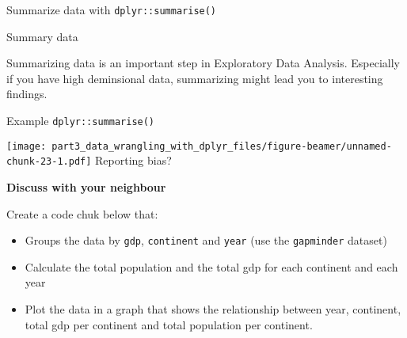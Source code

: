 \documentclass[ignorenonframetext,]{beamer}
\newenvironment{Shaded}{\begin{snugshade}}{\end{snugshade}}
\newcommand{\DataTypeTok}[1]{\textcolor[rgb]{0.13,0.29,0.53}{#1}}
\newcommand{\KeywordTok}[1]{\textcolor[rgb]{0.13,0.29,0.53}{\textbf{#1}}}
\newcommand{\NormalTok}[1]{#1}
\newcommand{\OperatorTok}[1]{\textcolor[rgb]{0.81,0.36,0.00}{\textbf{#1}}}
\newcommand{\StringTok}[1]{\textcolor[rgb]{0.31,0.60,0.02}{#1}}
\providecommand{\tightlist}{%
  \setlength{\itemsep}{0pt}\setlength{\parskip}{0pt}}
\begin{document}
\begin{frame}[fragile]{Summarize data with \texttt{dplyr::summarise()}}
\protect\hypertarget{summarize-data-with-dplyrsummarise}{}

\begin{block}{Summary data}

Summarizing data is an important step in Exploratory Data Analysis.
Especially if you have high deminsional data, summarizing might lead you
to interesting findings.

\end{block}

\begin{block}{Example \texttt{dplyr::summarise()}}

\begin{Shaded}
\end{Shaded}

\texttt{[image: part3\_data\_wrangling\_with\_dplyr\_files/figure-beamer/unnamed-chunk-23-1.pdf]}
Reporting bias?

\end{block}

\begin{block}{\textbf{Discuss with your neighbour}}

Create a code chuk below that:

\begin{itemize}
\tightlist
\item
  Groups the data by \texttt{gdp}, \texttt{continent} and \texttt{year}
  (use the \texttt{gapminder} dataset)
\item
  Calculate the total population and the total gdp for each continent
  and each year
\item
  Plot the data in a graph that shows the relationship between year,
  continent, total gdp per continent and total population per continent.
\end{itemize}


\end{block}
\end{frame}
\end{document}
